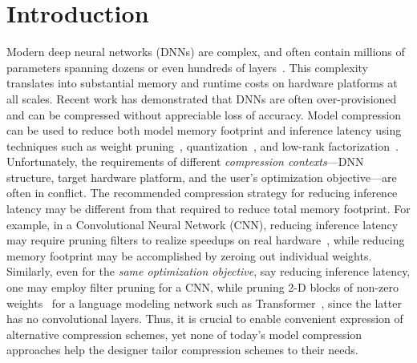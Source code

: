 \section{Introduction}


Modern deep neural networks (DNNs) are complex,
and often contain millions of parameters spanning
dozens or even hundreds of layers~\cite{he2016deep,huang:2017}.
%
This complexity translates into substantial memory and runtime costs
on hardware platforms at all scales.
%
Recent work has demonstrated that DNNs are often over-provisioned and can be compressed without appreciable loss of accuracy.
Model compression can be used to
reduce both model memory footprint and inference latency using techniques such as
weight pruning~\cite{han2015learning,luo2017thinet},
quantization~\cite{gupta2015deep}, and low-rank
factorization~\cite{jaderberg2014speeding,denton2014exploiting}.
%
Unfortunately, the requirements of
different {\em compression contexts}---DNN structure,
target hardware platform, and the user's optimization objective---are often in conflict.
%
The recommended compression strategy for reducing inference latency
may be different from that required to reduce total memory footprint.
%
For example, in a Convolutional Neural Network (CNN),
reducing inference latency may require pruning filters to realize speedups on real hardware~\cite{li2016pruning}, while reducing memory footprint may be accomplished by zeroing out individual weights.
%
Similarly, even for the {\em same optimization objective},
say reducing inference latency, one may employ filter pruning for a CNN,
while pruning 2-D blocks of non-zero weights~\cite{gray:2017} for a
language modeling network such as Transformer~\cite{vaswani:2017},
since the latter has no convolutional layers.
%
Thus, it is crucial to enable convenient expression of 
alternative compression schemes, yet
none of today's model compression approaches help the designer
tailor compression schemes to their needs.


